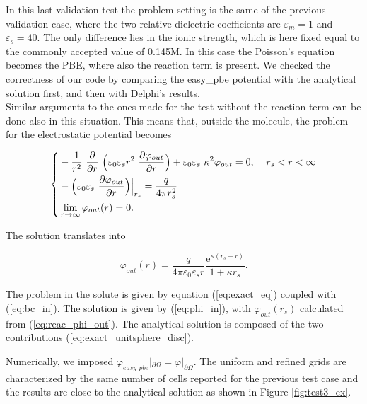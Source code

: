 \documentclass[11pt,a4paper]{article}
\begin{document}
In this last validation test the problem setting is the same of the previous validation case, where the two relative dielectric coefficients are $\varepsilon_m = 1$ and $\varepsilon_s = 40$. The only difference lies in the ionic strength, which is here fixed equal to the commonly accepted value of 0.145M. In this case the Poisson's equation becomes the PBE, where also the reaction term is present. We checked the correctness of our code by comparing the easy\_pbe potential with the analytical solution first, and then with Delphi's results. \\
Similar arguments to the ones made for the test without the reaction term can be done also in this situation. This means that, outside the molecule, the problem for the electrostatic potential becomes

\begin{equation}
    \left\{
    \begin{aligned}
    & - \frac{1}{r^2}\ \frac{\partial}{\partial r}\ \Big( {\varepsilon}_0 \varepsilon_s r^2\ \frac{\partial {\varphi}_{out}}{\partial r} \Big) + {\varepsilon}_0 \varepsilon_s\ \kappa^2 {\varphi}_{out} = 0, & \mbox{\;} r_s < r < \infty \\
     & - \Big( {\varepsilon}_0 \varepsilon_s\ \frac{\partial {\varphi}_{out}}{\partial r} \Big) \Big|_{r_s} = \frac{{q}}{4 \pi r_s^2} & \\
    & \lim_{r \to \infty} {\varphi}_{out}(r) = 0. &
    \end{aligned}
    \right.
    \label{eq:reaction_out}
\end{equation}

The solution translates into 

\begin{equation}
    \varphi_{out}(r) = \frac{{q}}{4 \pi {\varepsilon}_0 \varepsilon_s r} \frac{\mathrm{e}^{\kappa(r_s - r)}}{1 + \kappa r_s}.
    \label{eq:reac_phi_out}
\end{equation}

The problem in the solute is given by equation (\ref{eq:exact_eq}) coupled with (\ref{eq:bc_in}). The solution is given by (\ref{eq:phi_in}), with $\varphi_{out}(r_s)$ calculated from (\ref{eq:reac_phi_out}). The analytical solution is composed of the two contributions  (\ref{eq:exact_unitsphere_disc}). 

\bigskip
Numerically, we imposed ${\varphi}_{easy\_pbe}|_{\partial \Omega} = {\varphi}|_{\partial \Omega}$. The uniform and refined grids are characterized by the same number of cells reported for the previous test case and the results are close to the analytical solution as shown in Figure \ref{fig:test3_ex}.
\end{document}
